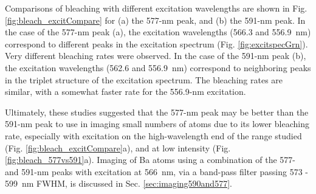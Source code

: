 Comparisons of bleaching with different excitation wavelengths are shown in Fig. \ref{fig:bleach_excitCompare} for (a) the 577-nm peak, and (b) the 591-nm peak.  In the case of the 577-nm peak (a), the excitation wavelengths (566.3 and 556.9~nm) correspond to different peaks in the excitation spectrum (Fig. \ref{fig:excitspecGrn}).  Very different bleaching rates were observed.  In the case of the 591-nm peak (b), the excitation wavelengths (562.6 and 556.9~nm) correspond to neighboring peaks in the triplet structure of the excitation spectrum.  The bleaching rates are similar, with a somewhat faster rate for the 556.9-nm excitation.


Ultimately, these studies suggested that the 577-nm peak may be better than the 591-nm peak to use in imaging small numbers of atoms due to its lower bleaching rate, especially with excitation on the high-wavelength end of the range studied (Fig. \ref{fig:bleach_excitCompare}a), and at low intensity (Fig. \ref{fig:bleach_577vs591}a).  Imaging of Ba atoms using a combination of the 577- and 591-nm peaks with excitation at 566~nm, via a band-pass filter passing 573 - 599~nm FWHM, is discussed in Sec. \ref{sec:imaging590and577}.

